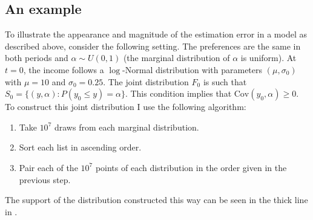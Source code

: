 \documentclass[english, a4paper,12pt]{article}
\begin{document}
\subsection{An example}
To illustrate the appearance and magnitude of the estimation error in a model as described above, consider the following setting. The preferences are the same in both periods and $\alpha \sim U(0,1)$ (the marginal distribution of $\alpha$ is uniform). At $t = 0$, the income follows a $\log$-Normal distribution with parameters $(\mu, \sigma_{0})$ with $\mu = 10$ and $\sigma_{0} = 0.25$. The joint distribution $F_{0}$ is such that $S_{0} = \{(y,\alpha) : P(y_{0} \leq y) = \alpha\}$. This condition implies that $\mathrm{Cov}(y_{0}, \alpha) \geq 0$. To construct this joint distribution I use the following algorithm:
	\begin{enumerate}
		\item Take $10^{7}$ draws from each marginal distribution.
		\item Sort each list in ascending order.
		\item Pair each of the $10^{7}$ points of each distribution in the order given in the previous step.
	\end{enumerate}
The support of the distribution constructed this way can be seen in the thick line in . 
\end{document}
